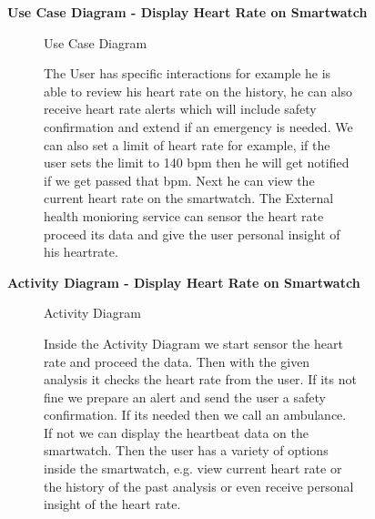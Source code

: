 \documentclass{article}
\begin{document}
	\begin{figure}[htbp]
		\textbf{Use Case Diagram - Display Heart Rate on Smartwatch}
		\centering
		\begin{subfigure}{\textwidth}
			\resizebox{\textwidth}{!}{}
			\caption{Use Case Diagram}
		\end{subfigure}
		\begin{subfigure}{\textwidth}
			The User has specific interactions for example he is able to review his heart rate on the history, he can also receive
			heart rate alerts which will include safety confirmation and extend if an emergency is needed. We can also set a limit of heart rate for example,
			if the user sets the limit to 140 bpm then he will get notified if we get passed that bpm. Next he can view the current heart rate on the smartwatch.
			The External health monioring service can sensor the heart rate proceed its data and give the user personal insight of his heartrate. 
		\end{subfigure}
	\end{figure}
	\clearpage

	\begin{figure}[htbp]
		\textbf{Activity Diagram - Display Heart Rate on Smartwatch}
		\centering
		\begin{subfigure}{\textwidth}
			\resizebox{\textwidth}{!}{}
			\caption{Activity Diagram}
		\end{subfigure}
		\begin{subfigure}{\textwidth}
			Inside the Activity Diagram we start sensor the heart rate and proceed the data. Then with the given analysis it checks the 
			heart rate from the user. If its not fine we prepare an alert and send the user a safety confirmation. If its needed then we call an ambulance. If not 
			we can display the heartbeat data on the smartwatch. Then the user has a variety of options inside the smartwatch, e.g. 
			view current heart rate or the history of the past analysis or even receive personal insight of the heart rate. 
		\end{subfigure}
	\end{figure}
\end{document}
